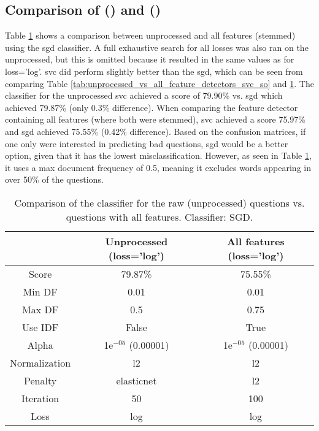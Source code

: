 \subsection[Comparison of SVC and SGD]{Comparison of  () and  ()}
\label{sec:comparing_svc_sgd}
Table \ref{tab:unprocessed_vs_all_feature_detectors_sgd_so} shows a comparison between unprocessed and all features (stemmed) using the \gls{sgd} classifier.
A full exhaustive search for all losses was also ran on the unprocessed, but this is omitted because it resulted in the same values as for loss='log'.
\vspace{0.5em}\newline
\gls{svc} did perform slightly better than the \gls{sgd}, which can be seen from comparing Table \ref{tab:unprocessed_vs_all_feature_detectors_svc_so} and \ref{tab:unprocessed_vs_all_feature_detectors_sgd_so}.
The classifier for the unprocessed \gls{svc} achieved a score of 79.90\% vs. \gls{sgd} which achieved 79.87\% (only 0.3\% difference).
When comparing the feature detector containing all features (where both were stemmed), \gls{svc} achieved a score 75.97\% and \gls{sgd} achieved 75.55\% (0.42\% difference). 
\vspace{0.5em}\newline	
Based on the confusion matrices, if one only were interested in predicting bad questions, \gls{sgd} would be a better option, given that it has the lowest misclassification.
However, as seen in Table \ref{tab:unprocessed_vs_all_feature_detectors_sgd_so}, it uses a max document frequency of 0.5, meaning it excludes words appearing in over 50\% of the questions.

\begin{table}[!h]%
	\centering
	\begin{tabular}{| c | c | c |}
		\hline
		~				& Unprocessed (loss='log')	& All features (loss='log')	\\ \hline
		Score 			& 79.87\%					& 75.55\%					\\ \hline
		Min DF 			& 0.01						& 0.01						\\ \hline
		Max DF 			& 0.5						& 0.75						\\ \hline
		Use IDF			& False						& True						\\ \hline
		Alpha 			& 1e$^{-05}$ (0.00001)		& 1e$^{-05}$ (0.00001)		\\ \hline
		Normalization 	& l2						& l2						\\ \hline		
		Penalty 		& elasticnet				& l2						\\ \hline
		Iteration 		& 50						& 100						\\ \hline
		Loss 			& log						& log						\\ \hline		
	\end{tabular}
	\caption{Comparison of the classifier for the raw (unprocessed) questions vs. questions with all features. Classifier: SGD.}
	\label{tab:unprocessed_vs_all_feature_detectors_sgd_so}
\end{table}

